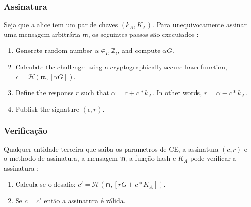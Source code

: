 \begin{enumerate}

\iffalse

\subsubsection*{Assinatura}

Seja que a alice tem um par de chaves \((k_A, K_A)\). Para unequivocamente assinar uma mensagem arbitrária $\mathfrak{m}$, os seguintes passos são executados :


\begin{enumerate}
	\item Generate random number $\alpha \in_R \mathbb{Z}_l$, and compute $\alpha G$.
	\item Calculate the challenge using a cryptographically secure hash function, \(c = \mathcal{H}(\mathfrak{m},[\alpha G])\).
	\item Define the response $r$ such that $\alpha = r + c*k_A$. In other words, $r = \alpha - c*k_A$.
	\item Publish the signature $(c, r)$.
\end{enumerate}

\subsubsection*{Verificação}

Qualquer entidade terceira que saiba os parametros de CE, a assinatura $(c, r)$ e o methodo de assinatura, a mensagem $\mathfrak{m}$, a função hash e $K_A$ pode verificar a assinatura :


\begin{enumerate}
	\item Calcula-se o desafio: \(c' = \mathcal{H}(\mathfrak{m},[r G + c*K_A])\).
	\item Se $c = c'$ então a assinatura é válida.
\end{enumerate}


\end{enumerate}
